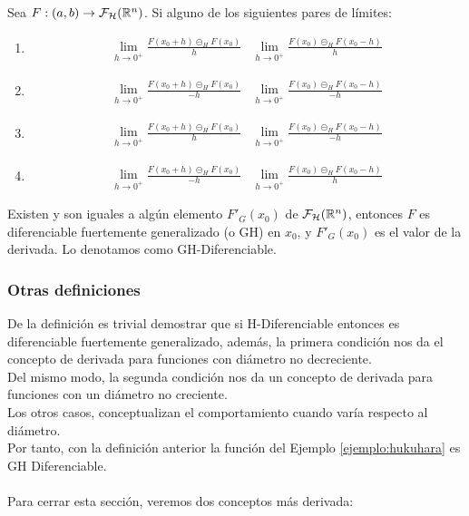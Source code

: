 \begin{definicion}
	Sea $F: (a, b) \rightarrow \mathcal{F}_\mathcal{H}(\mathbb R^n)$. Si alguno de los siguientes pares de límites:
	
	\begin{enumerate}
		\item 	
		\[
		\begin{array}{c||c}
		\lim\limits_{h \rightarrow 0^+} \frac{F(x_0 + h) \circleddash_H F(x_0)}{h} & \lim\limits_{h \rightarrow 0^+} \frac{F(x_0) \circleddash_H F(x_0 - h)}{h}
		\end{array}
		\]
		\item 	
		\[
		\begin{array}{c||c}
		\lim\limits_{h \rightarrow 0^+} \frac{F(x_0 + h) \circleddash_H F(x_0)}{-h} & \lim\limits_{h \rightarrow 0^+} \frac{F(x_0) \circleddash_H F(x_0 - h)}{-h}
		\end{array}
		\]
		\item 	
		\[
		\begin{array}{c||c}
		\lim\limits_{h \rightarrow 0^+} \frac{F(x_0 + h) \circleddash_H F(x_0)}{h} & \lim\limits_{h \rightarrow 0^+} \frac{F(x_0) \circleddash_H F(x_0 - h)}{-h}
		\end{array}
		\]
		\item 	
		\[
		\begin{array}{c||c}
		\lim\limits_{h \rightarrow 0^+} \frac{F(x_0 + h) \circleddash_H F(x_0)}{-h} & \lim\limits_{h \rightarrow 0^+} \frac{F(x_0) \circleddash_H F(x_0 - h)}{h}
		\end{array}
		\]
	\end{enumerate}
	Existen y son iguales a algún elemento $F'_G(x_0)$ de $\mathcal{F}_\mathcal{H}(\mathbb R^n)$, entonces $F$ es diferenciable fuertemente generalizado (o GH) en $x_0$, y $F'_G(x_0)$ es el valor de la derivada. Lo denotamos como GH-Diferenciable.
\end{definicion}

\subsubsection{Otras definiciones}
De la definición es trivial demostrar que si H-Diferenciable entonces es diferenciable fuertemente generalizado, además, la primera condición nos da el concepto de derivada para funciones con diámetro no decreciente. \\
Del mismo modo, la segunda condición nos da un concepto de derivada para funciones con un diámetro no creciente. \\
Los otros casos, conceptualizan el comportamiento cuando varía respecto al diámetro. \\
Por tanto, con la definición anterior la función del Ejemplo \ref{ejemplo:hukuhara} es GH Diferenciable. \\ \\
Para cerrar esta sección, veremos dos conceptos más derivada:

